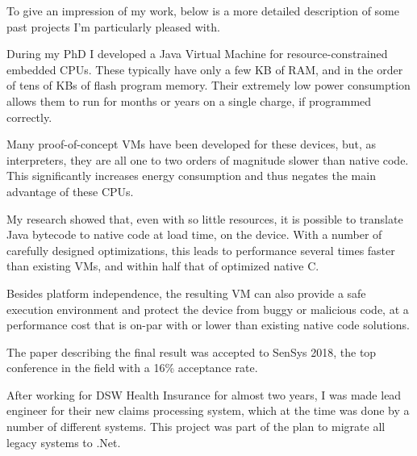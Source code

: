 \documentclass[10pt,a4paper]{../altacv}
\begin{document}
	\begin{fullwidth}
		
		To give an impression of my work, below is a more detailed description of some past projects I’m particularly pleased with.
		
		\bigskip
		
		
		During my PhD I developed a Java Virtual Machine for resource-constrained embedded CPUs. These typically have only a few KB of RAM, and in the order of tens of KBs of flash program memory. Their extremely low power consumption allows them to run for months or years on a single charge, if programmed correctly.
		
		\medskip\medskip
		
		Many proof-of-concept VMs have been developed for these devices, but, as interpreters, they are all one to two orders of magnitude slower than native code. This significantly increases energy consumption and thus negates the main advantage of these CPUs.
		
		\medskip\medskip
		
		My research showed that, even with so little resources, it is possible to translate Java bytecode to native code at load time, on the device. With a number of carefully designed optimizations, this leads to performance several times faster than existing VMs, and within half that of optimized native C.
		
		\medskip\medskip
		
		Besides platform independence, the resulting VM can also provide a safe execution environment and protect the device from buggy or malicious code, at a performance cost that is on-par with or lower than existing native code solutions.
		
		\medskip\medskip
		
		The paper describing the final result was accepted to SenSys 2018, the top conference in the field with a 16\% acceptance rate.
		
		\bigskip\bigskip
		
		\cvsubsection{Health insurance claims processing}
		After working for DSW Health Insurance for almost two years, I was made lead engineer for their new claims processing system, which at the time was done by a number of different systems. This project was part of the plan to migrate all legacy systems to .Net.
		
		\medskip\medskip
		

\end{fullwidth}
\end{document}

